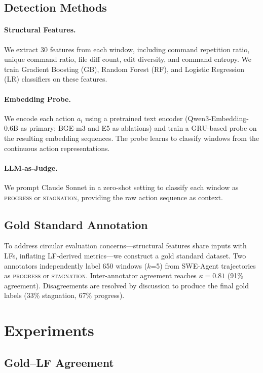 \documentclass[11pt,a4paper]{article}
\begin{document}
\subsection{Detection Methods}

\paragraph{Structural Features.}
We extract 30 features from each window, including command repetition ratio, unique command ratio, file diff count, edit diversity, and command entropy.
We train Gradient Boosting (GB), Random Forest (RF), and Logistic Regression (LR) classifiers on these features.

\paragraph{Embedding Probe.}
We encode each action $a_i$ using a pretrained text encoder (Qwen3-Embedding-0.6B as primary; BGE-m3 and E5 as ablations) and train a GRU-based probe on the resulting embedding sequences.
The probe learns to classify windows from the continuous action representations.

\paragraph{LLM-as-Judge.}
We prompt Claude Sonnet in a zero-shot setting to classify each window as \textsc{progress} or \textsc{stagnation}, providing the raw action sequence as context.

\subsection{Gold Standard Annotation}

To address circular evaluation concerns---structural features share inputs with LFs, inflating LF-derived metrics---we construct a gold standard dataset.
Two annotators independently label 650 windows ($k$=5) from SWE-Agent trajectories as \textsc{progress} or \textsc{stagnation}.
Inter-annotator agreement reaches $\kappa = 0.81$ (91\% agreement).
Disagreements are resolved by discussion to produce the final gold labels (33\% stagnation, 67\% progress).

\section{Experiments}

\subsection{Gold--LF Agreement}
\label{sec:gold-lf}
\end{document}
